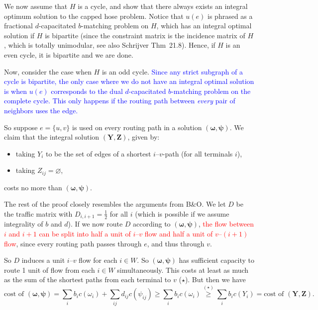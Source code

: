 \documentclass[11pt]{article}
\begin{document}
    We now assume that $H$ is a cycle, and show that there always exists an integral optimum solution to the capped hose problem.
    Notice that $u(e)$ is phrased as a fractional $d$-capacitated $b$-matching problem on $H$, which has an integral optimal solution if $H$ is bipartite (since the constraint matrix is the incidence matrix of $H$, which is totally unimodular, see also Schrijver Thm~21.8).
    Hence, if $H$ is an even cycle, it is bipartite and we are done.

    Now, consider the case when $H$ is an odd cycle.
    \textcolor{blue}{Since any strict subgraph of a cycle is bipartite, the only case where we do not have an integral optimal solution is when $u(e)$ corresponds to the dual $d$-capacitated $b$-matching problem on the complete cycle.
    This only happens if the routing path between \emph{every} pair of neighbors uses the edge.}

    So suppose $e = \{u, v\}$ is used on every routing path in a solution $(\boldsymbol \omega, \boldsymbol \psi)$.
    We claim that the integral solution $(\boldsymbol Y, \boldsymbol Z)$, given by:
    \begin{itemize}
        \item taking $Y_i$ to be the set of edges of a shortest $i$--$v$-path (for all terminals $i$),
        \item taking $Z_{ij} = \varnothing$,
    \end{itemize}
    costs no more than $(\boldsymbol \omega, \boldsymbol \psi)$.

    The rest of the proof closely resembles the arguments from B\&O\@.
    We let $D$ be the traffic matrix with $D_{i,i+1} = \frac 1 2$ for all $i$ (which is possible if we assume integrality of $b$ and $d$).
    If we now route $D$ according to $(\boldsymbol \omega, \boldsymbol \psi)$, \textcolor{red}{the flow between $i$ and $i+1$ can be split into half a unit of $i$--$v$ flow and half a unit of $v$--$(i+1)$ flow}, since every routing path passes through $e$, and thus through $v$.

    So $D$ induces a unit $i$--$v$ flow for each $i \in W$.
    So $(\boldsymbol \omega, \boldsymbol \psi)$ has sufficient capacity to route 1 unit of flow from each $i \in W$ simultaneously.
    This costs at least as much as the sum of the shortest paths from each terminal to $v$ ($\star$).
    But then we have
    \[
        \text{cost of $(\boldsymbol \omega, \boldsymbol \psi)$} = \sum_i b_i c(\omega_i) + \sum_{ij} d_{ij} c(\psi_{ij}) \ge \sum_i b_i c(\omega_i) \overset{(\star)}{\ge} \sum_i b_i c(Y_i) = \text{cost of $(\boldsymbol Y, \boldsymbol Z)$}.
    \]
\end{document}
